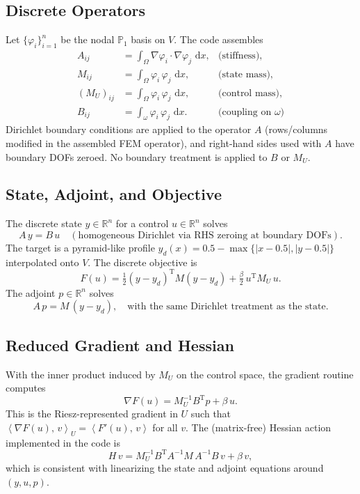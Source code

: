 \documentclass[11pt,a4paper]{article}
\numberwithin{equation}{section}
\theoremstyle{plain}
\theoremstyle{definition}
\newcommand{\R}{\mathbb{R}}
\newcommand{\ip}[2]{\left\langle #1,\,#2 \right\rangle}
\newcommand{\td}{\,\mathrm{d}}
\newcommand{\T}{\mathrm{T}}
\begin{document}
\subsection{Discrete Operators}
Let $\{\varphi_i\}_{i=1}^n$ be the nodal $\mathbb{P}_1$ basis on $V$. The code assembles
\begin{align}
  A_{ij} &= \int_\Omega \nabla \varphi_i \cdot \nabla \varphi_j \,\td x, &\text{(stiffness)}, \\
  M_{ij} &= \int_\Omega \varphi_i \, \varphi_j \,\td x, &\text{(state mass)}, \\
  (M_U)_{ij} &= \int_\Omega \varphi_i \, \varphi_j \,\td x, &\text{(control mass)}, \\
  B_{ij} &= \int_\omega \varphi_i \, \varphi_j \,\td x. &\text{(coupling on $\omega$)}
\end{align}
Dirichlet boundary conditions are applied to the operator $A$ (rows/columns modified in the assembled FEM operator), and right-hand sides used with $A$ have boundary DOFs zeroed. No boundary treatment is applied to $B$ or $M_U$.

\subsection{State, Adjoint, and Objective}
The discrete state $y \in \R^n$ for a control $u \in \R^n$ solves
\begin{equation}
  A\,y = B\,u \quad (\text{homogeneous Dirichlet via RHS zeroing at boundary DOFs}).
\end{equation}
The target is a pyramid-like profile $y_d(x) = 0.5 - \max\{\lvert x-0.5\rvert, \lvert y-0.5\rvert\}$ interpolated onto $V$. The discrete objective is
\begin{equation}
  F(u) = \tfrac{1}{2}(y-y_d)^\T M (y-y_d) + \tfrac{\beta}{2}\, u^\T M_U \, u.
\end{equation}
The adjoint $p \in \R^n$ solves
\begin{equation}
  A\,p = M\,(y - y_d), \quad \text{with the same Dirichlet treatment as the state.}
\end{equation}

\subsection{Reduced Gradient and Hessian}
With the inner product induced by $M_U$ on the control space, the gradient routine computes
\begin{equation}
  \nabla F(u) = M_U^{-1} B^\T p + \beta\,u.
\end{equation}
This is the Riesz-represented gradient in $U$ such that $\ip{\nabla F(u)}{v}_U = \ip{F'(u)}{v}$ for all $v$. The (matrix-free) Hessian action implemented in the code is
\begin{equation}
  H\,v = M_U^{-1} B^\T A^{-1} M\, A^{-1} B\, v + \beta\, v,
\end{equation}
which is consistent with linearizing the state and adjoint equations around $(y,u,p)$.
\end{document}
